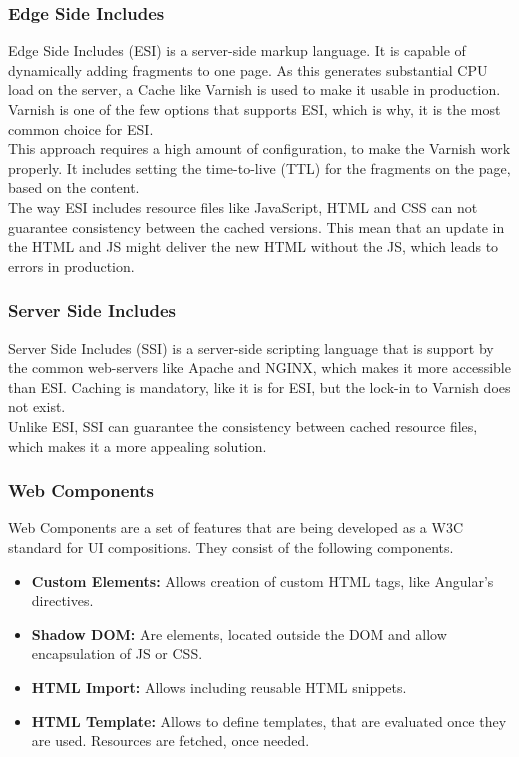 \subsubsection{Edge Side Includes}
Edge Side Includes (ESI) is a server-side markup language. It is capable of dynamically adding fragments to one page. As this generates substantial CPU load on the server, a Cache like Varnish is used to make it usable in production. Varnish is one of the few options that supports ESI, which is why, it is the most common choice for ESI.\\
This approach requires a high amount of configuration, to make the Varnish work properly. It includes setting the time-to-live (TTL) for the fragments on the page, based on the content.\\
The way ESI includes resource files like JavaScript, HTML and CSS can not guarantee consistency between the cached versions. This mean that an update in the HTML and JS might deliver the new HTML without the JS, which leads to errors in production.

\subsubsection{Server Side Includes}
Server Side Includes (SSI) is a server-side scripting language that is support by the common web-servers like Apache and NGINX, which makes it more accessible than ESI. Caching is mandatory, like it is for ESI, but the lock-in to Varnish does not exist.\\
Unlike ESI, SSI can guarantee the consistency between cached resource files, which makes it a more appealing solution.

\subsubsection{Web Components}
Web Components are a set of features that are being developed as a W3C standard for UI compositions. They consist of the following components.
\begin{itemize}
	\item \textbf{Custom Elements:} Allows creation of custom HTML tags, like Angular's directives.
	\item \textbf{Shadow DOM:} Are elements, located outside the DOM and allow encapsulation of JS or CSS.
	\item \textbf{HTML Import:} Allows including reusable HTML snippets.
	\item \textbf{HTML Template:} Allows to define templates, that are evaluated once they are used. Resources are fetched, once needed.
\end{itemize}

